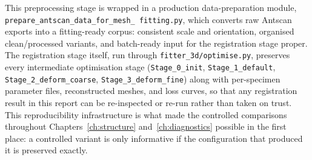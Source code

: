 This preprocessing stage is wrapped in a production data-preparation module,
\allowbreak\texttt{prepare\_antscan\_\allowbreak data\_for\_mesh\_\allowbreak
fitting.py}, which converts raw
Antscan exports into a fitting-ready corpus: consistent scale and
orientation, organised clean/processed variants, and batch-ready input for
the registration stage proper. The registration stage itself, run through
\texttt{fitter\_3d/\allowbreak optimise.py}, preserves every intermediate optimisation
stage (\texttt{Stage\_0\_init}, \texttt{Stage\_1\_default},
\texttt{Stage\_2\_deform\_coarse}, \texttt{Stage\_3\_deform\_fine}) along
with per-specimen parameter files, reconstructed meshes, and loss curves,
so that any registration result in this report can be re-inspected or
re-run rather than taken on trust. This reproducibility infrastructure is
what made the controlled comparisons throughout Chapters~\ref{ch:structure}
and~\ref{ch:diagnostics} possible in the first place: a controlled variant
is only informative if the configuration that produced it is preserved
exactly.
